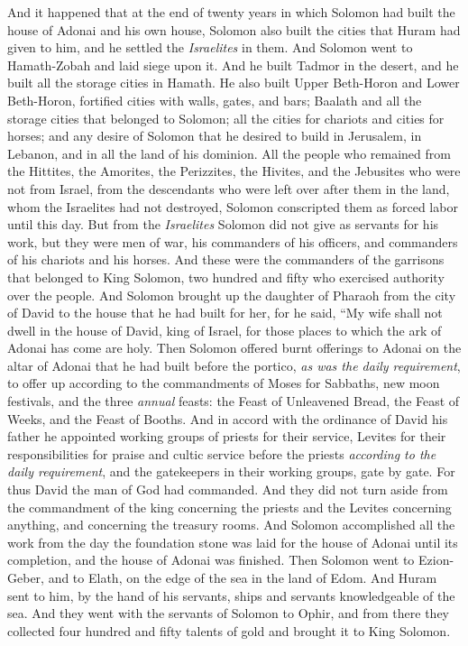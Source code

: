 \begin{biblechapter} %
 And it happened that at the end of twenty years in which Solomon had built the house of Adonai and his own house,
\verse Solomon also built the cities that Huram had given to him, and he settled the \textit{Israelites} in them.
\verse And Solomon went to Hamath-Zobah and laid siege upon it.
\verse And he built Tadmor in the desert, and he built all the storage cities in Hamath.
\verse He also built Upper Beth-Horon and Lower Beth-Horon, fortified cities with walls, gates, and bars;
\verse Baalath and all the storage cities that belonged to Solomon; all the cities for chariots and cities for horses; and any desire of Solomon that he desired to build in Jerusalem, in Lebanon, and in all the land of his dominion.
\verse All the people who remained from the Hittites, the Amorites, the Perizzites, the Hivites, and the Jebusites who were not from Israel,
\verse from the descendants who were left over after them in the land, whom the Israelites had not destroyed, Solomon conscripted them as forced labor until this day.
\verse But from the \textit{Israelites} Solomon did not give as servants for his work, but they were men of war, his commanders of his officers, and commanders of his chariots and his horses.
\verse And these were the commanders of the garrisons that belonged to King Solomon, two hundred and fifty who exercised authority over the people.
\verse And Solomon brought up the daughter of Pharaoh from the city of David to the house that he had built for her, for he said, “My wife shall not dwell in the house of David, king of Israel, for those places to which the ark of Adonai has come are holy.
\verse Then Solomon offered burnt offerings to Adonai on the altar of Adonai that he had built before the portico,
\verse \textit{as was the daily requirement}, to offer up according to the commandments of Moses for Sabbaths, new moon festivals, and the three \textit{annual} feasts: the Feast of Unleavened Bread, the Feast of Weeks, and the Feast of Booths.
\verse And in accord with the ordinance of David his father he appointed working groups of priests for their service, Levites for their responsibilities for praise and cultic service before the priests \textit{according to the daily requirement}, and the gatekeepers in their working groups, gate by gate. For thus David the man of God had commanded.
\verse And they did not turn aside from the commandment of the king concerning the priests and the Levites concerning anything, and concerning the treasury rooms.
\verse And Solomon accomplished all the work from the day the foundation stone was laid for the house of Adonai until its completion, and the house of Adonai was finished.
\verse Then Solomon went to Ezion-Geber, and to Elath, on the edge of the sea in the land of Edom.
\verse And Huram sent to him, by the hand of his servants, ships and servants knowledgeable of the sea. And they went with the servants of Solomon to Ophir, and from there they collected four hundred and fifty talents of gold and brought it to King Solomon.
\end{biblechapter}

